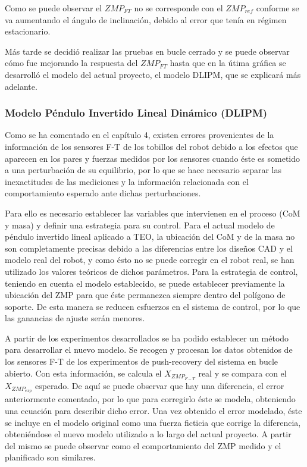 Como se puede observar el $ZMP_{FT}$ no se corresponde con el $ZMP_{ref}$ conforme se va aumentando el ángulo de inclinación, debido al error que tenía en régimen estacionario. 



Más tarde se decidió realizar las pruebas en bucle cerrado y se puede observar cómo fue mejorando la respuesta del $ZMP_{FT}$ hasta que en la útima gráfica se desarrolló el modelo del actual proyecto, el modelo DLIPM, que se explicará más adelante.



\subsubsection{Modelo Péndulo Invertido Lineal Dinámico (DLIPM)}\label{DLIPM}

Como se ha comentado en el capítulo 4, existen errores provenientes de la información de los sensores F-T de los tobillos del robot debido a los efectos que aparecen en los pares y fuerzas medidos por los sensores cuando éste es sometido a una perturbación de su equilibrio, por lo que se hace necesario separar las inexactitudes de las mediciones y la información relacionada con el comportamiento esperado ante dichas perturbaciones.

Para ello es necesario establecer las variables que intervienen en el proceso (CoM y masa) y definir una estrategia para su control. Para el actual modelo de péndulo invertido lineal aplicado a TEO, la ubicación del CoM y de la masa no son completamente precisas debido a las diferencias entre los diseños CAD y el modelo real del robot, y como ésto no se puede corregir en el robot real, se han utilizado los valores teóricos de dichos parámetros. Para la estrategia de control, teniendo en cuenta el modelo establecido, se puede establecer previamente la ubicación del ZMP para que éste permanezca siempre dentro del polígono de soporte. De esta manera se reducen esfuerzos en el sistema de control, por lo que las ganancias de ajuste serán menores.

A partir de los experimentos desarrollados se ha podido establecer un método para desarrollar el nuevo modelo. Se recogen y procesan los datos obtenidos de los sensores F-T de los experimentos de push-recovery del sistema en bucle abierto. Con esta información, se calcula el $X_{ZMP_{F-T}}$ real y se compara con el $X_{ZMP_{exp}}$ esperado. De aquí se puede observar que hay una diferencia, el error anteriormente comentado, por lo que para corregirlo éste se modela, obteniendo una ecuación para describir dicho error. Una vez obtenido el error modelado, éste se incluye en el modelo original como una fuerza ficticia que corrige la diferencia, obteniéndose el nuevo modelo utilizado a lo largo del actual proyecto. A partir del mismo se puede observar como el comportamiento del ZMP medido y el planificado son similares.

